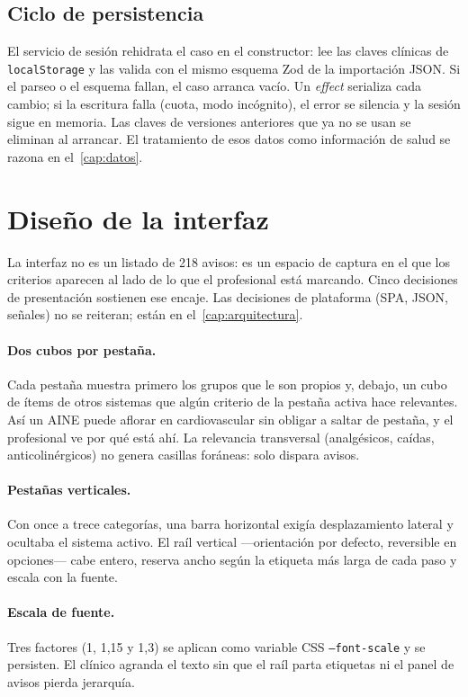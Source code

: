 \subsection{Ciclo de persistencia}

El servicio de sesión rehidrata el caso en el constructor: lee las claves
clínicas de \texttt{localStorage} y las valida con el mismo esquema Zod
de la importación JSON. Si el parseo o el esquema fallan, el caso arranca
vacío. Un \textit{effect} serializa cada cambio; si la escritura falla
(cuota, modo incógnito), el error se silencia y la sesión sigue en memoria.
Las claves de versiones anteriores que ya no se usan se eliminan al arrancar.
El tratamiento de esos datos como información de salud se razona en
el~\cref{cap:datos}.

\section{Diseño de la interfaz}

La interfaz no es un listado de 218 avisos: es un espacio de captura
en el que los criterios aparecen al lado de lo que el profesional está
marcando. Cinco decisiones de presentación sostienen ese encaje. Las
decisiones de plataforma (SPA, JSON, señales) no se reiteran; están
en el~\cref{cap:arquitectura}.

\paragraph{Dos cubos por pestaña.}
Cada pestaña muestra primero los grupos que le son propios y, debajo,
un cubo de ítems de otros sistemas que algún criterio de la pestaña
activa hace relevantes. Así un AINE puede aflorar en cardiovascular
sin obligar a saltar de pestaña, y el profesional ve por qué está
ahí. La relevancia transversal (analgésicos, caídas, anticolinérgicos)
no genera casillas foráneas: solo dispara avisos.

\paragraph{Pestañas verticales.}
Con once a trece categorías, una barra horizontal exigía desplazamiento
lateral y ocultaba el sistema activo. El raíl vertical ---orientación
por defecto, reversible en opciones--- cabe entero, reserva ancho
según la etiqueta más larga de cada paso y escala con la fuente.

\paragraph{Escala de fuente.}
Tres factores (1, 1,15 y 1,3) se aplican como variable CSS
\texttt{--font-scale} y se persisten. El clínico agranda el texto sin
que el raíl parta etiquetas ni el panel de avisos pierda jerarquía.

